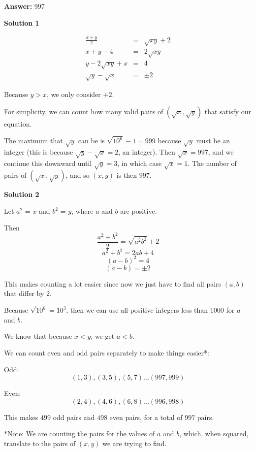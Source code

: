 \begin{enumerate}
 
 \textbf{Answer: }997



\textbf{Solution 1}


 \begin{eqnarray*} \frac{x+y}{2} &=& \sqrt{xy} + 2\\ x+y-4 &=& 2\sqrt{xy}\\ y - 2\sqrt{xy} + x &=& 4\\ \sqrt{y} - \sqrt{x} &=& \pm 2\end{eqnarray*}

 Because $y > x$, we only consider $+2$.

 For simplicity, we can count how many valid pairs of $(\sqrt{x},\sqrt{y})$ that satisfy our equation.

 The maximum that $\sqrt{y}$ can be is $\sqrt{10^6} - 1 = 999$ because $\sqrt{y}$ must be an integer (this is because $\sqrt{y} - \sqrt{x} = 2$, an integer). Then $\sqrt{x} = 997$, and we continue this downward until $\sqrt{y} = 3$, in which case $\sqrt{x} = 1$. The number of pairs of $(\sqrt{x},\sqrt{y})$, and so $(x,y)$ is then $\boxed{997}$.

 



\textbf{Solution 2}

Let $a^2$ = $x$ and $b^2$ = $y$, where $a$ and $b$ are positive.

 Then 
 \[\frac{a^2 + b^2}{2} = \sqrt{{a^2}{b^2}} +2\]
 \[a^2 + b^2 = 2ab + 4\]
 \[(a-b)^2 = 4\]
 \[(a-b) = \pm 2\]

 This makes counting a lot easier since now we just have to find all pairs $(a,b)$ that differ by 2.

 
Because $\sqrt{10^6} = 10^3$, then we can use all positive integers less than 1000 for $a$ and $b$.

 
We know that because $x < y$, we get $a < b$.

 
We can count even and odd pairs separately to make things easier*:

 
Odd: 
 \[(1,3) , (3,5) , (5,7)  .  .  .  (997,999)\]

 
Even: 
 \[(2,4) , (4,6) , (6,8)  .  .  .  (996,998)\]

 
This makes $499$ odd pairs and $498$ even pairs, for a total of $\boxed{997}$ pairs.

 


 $*$Note: We are counting the pairs for the values of $a$ and $b$, which, when squared, translate to the pairs of $(x,y)$ we are trying to find.


\end{enumerate}
